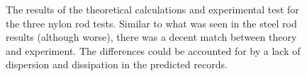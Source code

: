  \begin{figure}
\begin{subfigmatrix}{3}
\end{subfigmatrix}

   \caption[all]
   { \label{nylonThExp}
The results of the theoretical calculations and experimental test for the three nylon rod tests. Similar to what was seen in the steel rod results (although worse),  there was a decent match between theory and experiment. The differences could be accounted for by a lack of dispersion and dissipation in the predicted records.
 }
 \end{figure}
 
